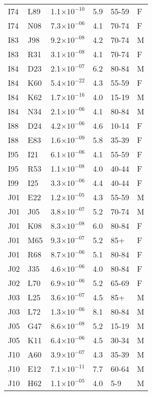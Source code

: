 \begin{longtable}{lllrll}
   I74 & L89 & 1.1$\times10^{-10}$ & 5.9 & 55-59 & F \\ 
   I74 & N08 & 7.3$\times10^{-06}$ & 4.1 & 70-74 & F \\ 
   I83 & J98 & 9.2$\times10^{-08}$ & 4.2 & 70-74 & M \\ 
   I83 & R31 & 3.1$\times10^{-08}$ & 4.1 & 70-74 & F \\ 
   I84 & D23 & 2.1$\times10^{-07}$ & 6.2 & 80-84 & M \\ 
   I84 & K60 & 5.4$\times10^{-22}$ & 4.3 & 55-59 & F \\ 
   I84 & K62 & 1.7$\times10^{-16}$ & 4.0 & 15-19 & M \\ 
   I84 & N34 & 2.1$\times10^{-06}$ & 4.1 & 80-84 & M \\ 
   I88 & D24 & 4.2$\times10^{-06}$ & 4.6 & 10-14 & F \\ 
   I88 & E83 & 1.6$\times10^{-09}$ & 5.8 & 35-39 & F \\ 
   I95 & I21 & 6.1$\times10^{-06}$ & 4.1 & 55-59 & F \\ 
   I95 & R53 & 1.1$\times10^{-08}$ & 4.0 & 40-44 & F \\ 
   I99 & I25 & 3.3$\times10^{-06}$ & 4.4 & 40-44 & F \\ 
   J01 & E22 & 1.2$\times10^{-05}$ & 4.3 & 55-59 & M \\ 
   J01 & J05 & 3.8$\times10^{-07}$ & 5.2 & 70-74 & M \\ 
   J01 & K08 & 8.3$\times10^{-08}$ & 6.0 & 80-84 & F \\ 
   J01 & M65 & 9.3$\times10^{-07}$ & 5.2 & 85+ & F \\ 
   J01 & R68 & 8.7$\times10^{-06}$ & 5.1 & 80-84 & F \\ 
   J02 & J35 & 4.6$\times10^{-06}$ & 4.0 & 80-84 & F \\ 
   J02 & L70 & 6.9$\times10^{-06}$ & 5.2 & 65-69 & F \\ 
   J03 & L25 & 3.6$\times10^{-07}$ & 4.5 & 85+ & M \\ 
   J03 & L72 & 1.3$\times10^{-06}$ & 8.1 & 80-84 & M \\ 
   J05 & G47 & 8.6$\times10^{-08}$ & 5.2 & 15-19 & M \\ 
   J05 & K11 & 6.4$\times10^{-06}$ & 4.5 & 30-34 & M \\ 
   J10 & A60 & 3.9$\times10^{-07}$ & 4.3 & 35-39 & M \\ 
   J10 & E12 & 7.1$\times10^{-11}$ & 7.7 & 60-64 & M \\ 
   J10 & H62 & 1.1$\times10^{-05}$ & 4.0 & 5-9 & M \\ 

\end{longtable}
